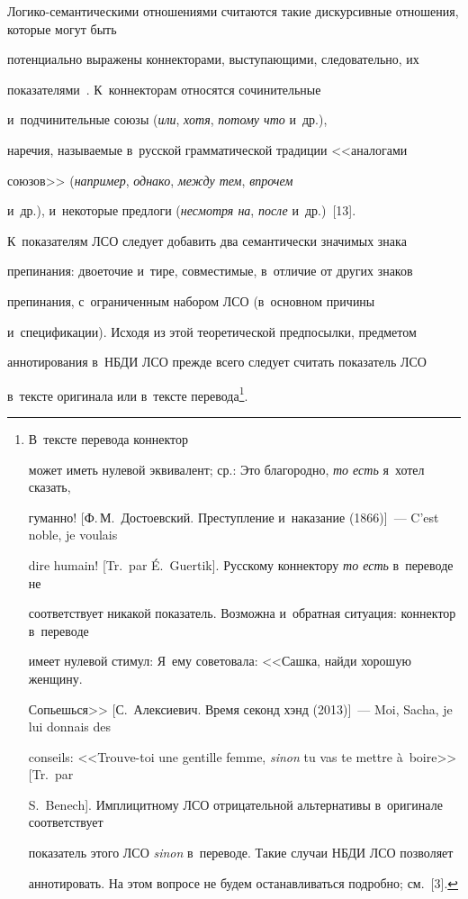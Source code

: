   Логико-семантическими отношениями считаются такие дискурсивные отношения, которые могут быть 


потенциально выражены коннекторами, выступающими, следовательно, их 


показателями~\cite[с.~311]{3-in}. К~коннекторам относятся сочинительные 


и~подчинительные союзы (\textit{или}, \textit{хотя}, \textit{потому что} и~др.), 


наречия, называемые в~русской грамматической традиции <<аналогами 


союзов>> (\textit{например}, \textit{однако}, \textit{между тем}, \textit{впрочем} 


и~др.), и~некоторые предлоги (\textit{несмотря на}, \textit{после} и~др.)~[13]. 


К~показателям ЛСО следует добавить два семантически значимых знака 


препинания: двоеточие и~тире, совместимые, в~отличие от других знаков 


препинания, с~ограниченным набором ЛСО (в~основном причины 


и~спецификации). Исходя из этой теоретической предпосылки, предметом 


аннотирования в~НБДИ ЛСО прежде всего следует считать показатель ЛСО 


в~тексте оригинала или в~тексте перевода\footnote{В~тексте перевода коннектор 


может иметь нулевой эквивалент; ср.: Это благородно, \textit{то есть} я~хотел сказать, 


гуманно! [Ф.\,М.~Достоевский. Преступление и~наказание (1866)]~--- C'est noble, je voulais 


dire humain! [Tr.\ par \'{E}.~Guertik]. Русскому коннектору \textit{то есть} в~переводе не 


соответствует никакой показатель. Возможна и~обратная ситуация: коннектор в~переводе 


имеет нулевой стимул: Я~ему советовала: <<Сашка, найди хорошую женщину. 


Сопьешься>> [С.~Алексиевич. Время секонд хэнд (2013)]~--- Moi, Sacha, je lui donnais des 


conseils: <<Trouve-toi une gentille femme, \textit{sinon} tu vas te mettre \`{a}~boire>> [Tr.\ par 


S.~Benech]. Имплицитному ЛСО отрицательной альтернативы в~оригинале соответствует 


показатель этого ЛСО \textit{sinon} в~переводе. Такие случаи НБДИ ЛСО позволяет 


аннотировать. На этом вопросе не будем останавливаться подробно; см.~[3].}.









